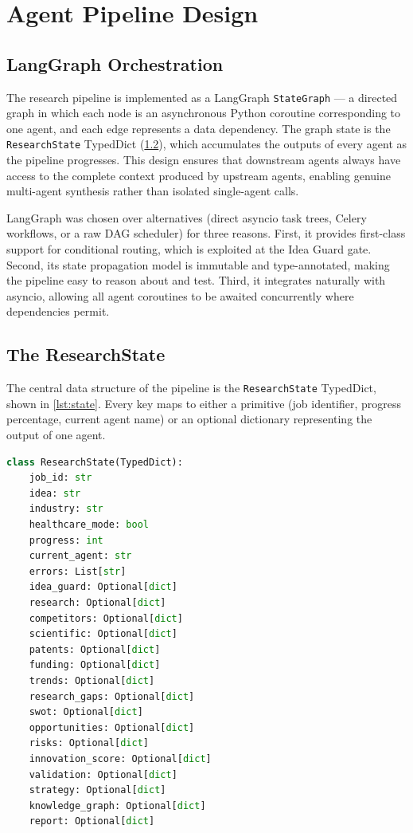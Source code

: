 \documentclass[12pt,a4paper,oneside]{book}
\begin{document}
\chapter{Agent Pipeline Design}
\label{chap:pipeline}

\section{LangGraph Orchestration}

The research pipeline is implemented as a LangGraph \texttt{StateGraph} — a directed graph in which each node is an asynchronous Python coroutine corresponding to one agent, and each edge represents a data dependency. The graph state is the \texttt{ResearchState} TypedDict (\cref{sec:state}), which accumulates the outputs of every agent as the pipeline progresses. This design ensures that downstream agents always have access to the complete context produced by upstream agents, enabling genuine multi-agent synthesis rather than isolated single-agent calls.

LangGraph was chosen over alternatives (direct asyncio task trees, Celery workflows, or a raw DAG scheduler) for three reasons. First, it provides first-class support for conditional routing, which is exploited at the Idea Guard gate. Second, its state propagation model is immutable and type-annotated, making the pipeline easy to reason about and test. Third, it integrates naturally with asyncio, allowing all agent coroutines to be awaited concurrently where dependencies permit.

\section{The ResearchState}
\label{sec:state}

The central data structure of the pipeline is the \texttt{ResearchState} TypedDict, shown in \cref{lst:state}. Every key maps to either a primitive (job identifier, progress percentage, current agent name) or an optional dictionary representing the output of one agent.

\begin{lstlisting}[caption={ResearchState TypedDict definition (agent-service/schemas/state.py)},
                   label={lst:state}, language=Python]
class ResearchState(TypedDict):
    job_id: str
    idea: str
    industry: str
    healthcare_mode: bool
    progress: int
    current_agent: str
    errors: List[str]
    idea_guard: Optional[dict]
    research: Optional[dict]
    competitors: Optional[dict]
    scientific: Optional[dict]
    patents: Optional[dict]
    funding: Optional[dict]
    trends: Optional[dict]
    research_gaps: Optional[dict]
    swot: Optional[dict]
    opportunities: Optional[dict]
    risks: Optional[dict]
    innovation_score: Optional[dict]
    validation: Optional[dict]
    strategy: Optional[dict]
    knowledge_graph: Optional[dict]
    report: Optional[dict]
\end{lstlisting}
\end{document}
